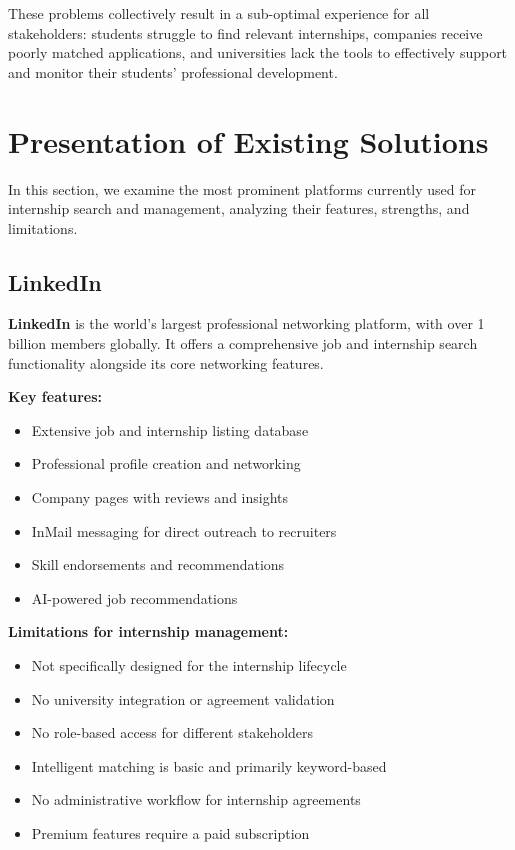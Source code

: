 These problems collectively result in a sub-optimal experience for all stakeholders: students struggle to find relevant internships, companies receive poorly matched applications, and universities lack the tools to effectively support and monitor their students' professional development.

\section{Presentation of Existing Solutions}

In this section, we examine the most prominent platforms currently used for internship search and management, analyzing their features, strengths, and limitations.

\subsection{LinkedIn}

\textbf{LinkedIn} is the world's largest professional networking platform, with over 1 billion members globally. It offers a comprehensive job and internship search functionality alongside its core networking features.

\textbf{Key features:}
\begin{itemize}
    \item Extensive job and internship listing database
    \item Professional profile creation and networking
    \item Company pages with reviews and insights
    \item InMail messaging for direct outreach to recruiters
    \item Skill endorsements and recommendations
    \item AI-powered job recommendations
\end{itemize}

\textbf{Limitations for internship management:}
\begin{itemize}
    \item Not specifically designed for the internship lifecycle
    \item No university integration or agreement validation
    \item No role-based access for different stakeholders
    \item Intelligent matching is basic and primarily keyword-based
    \item No administrative workflow for internship agreements
    \item Premium features require a paid subscription
\end{itemize}

